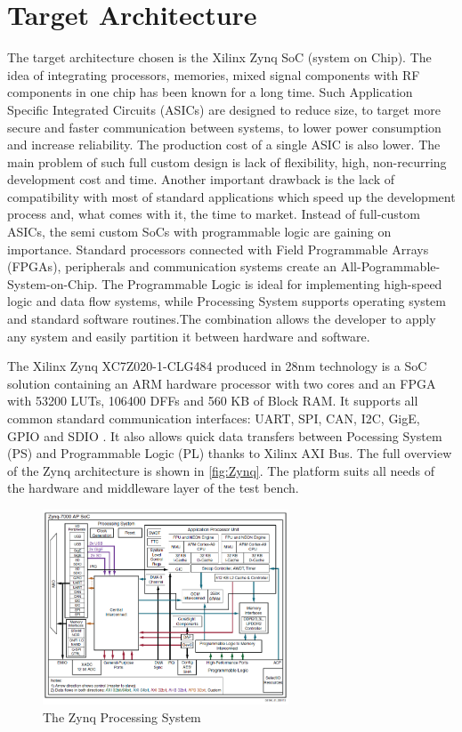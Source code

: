 \section {Target Architecture}
The target architecture chosen is the Xilinx Zynq SoC (system on Chip). The idea of integrating processors, memories, mixed signal components with RF components in one chip has been known for a long time. Such Application Specific Integrated Circuits (ASICs) are designed to reduce size, to target more secure and faster communication between systems, to lower power consumption and increase reliability. The production cost of a single ASIC is also lower. The main problem of such full custom design is lack of flexibility, high, non-recurring development cost and time. Another important drawback is the lack of compatibility with most of standard applications which speed up the development process and, what comes with it, the time to market. Instead of full-custom ASICs, the semi custom SoCs with programmable logic are gaining on importance. Standard processors connected with Field Programmable Arrays (FPGAs), peripherals and communication systems create an All-Pogrammable-System-on-Chip. The Programmable Logic is ideal for implementing high-speed logic and data flow systems, while Processing System supports operating system and standard software routines.The combination allows the developer to apply any system and easily partition it between hardware and software.

The Xilinx Zynq XC7Z020-1-CLG484 produced in 28nm technology is a SoC solution containing an ARM hardware processor with two cores and an FPGA with 53200 LUTs, 106400 DFFs and 560 KB of Block RAM. It supports all common standard communication interfaces: UART, SPI, CAN, I2C, GigE, GPIO and SDIO . It also allows quick data transfers between Pocessing System (PS) and Programmable Logic (PL) thanks to Xilinx AXI Bus. The full overview of the Zynq architecture is shown in \autoref{fig:Zynq}. The platform suits all needs of the hardware and middleware layer of the test bench.

\begin{figure}[H]
\centering
\includegraphics[width=0.65\textwidth]{figures/Zynq.png}
\caption{The Zynq Processing System~\cite{book:ZynqBook}}
\label{fig:Zynq}
\end{figure}

